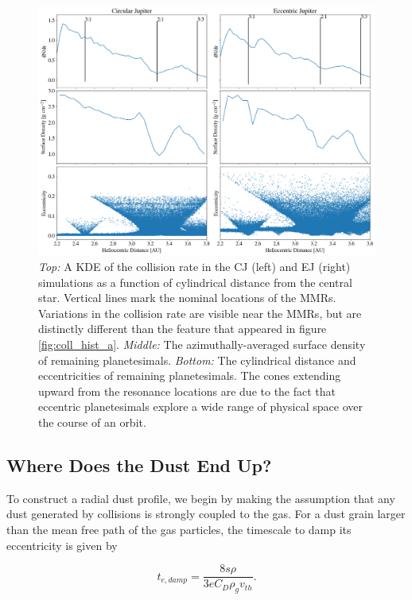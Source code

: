 \documentclass[onecolumn]{aastex63}
\begin{document}
\begin{figure}
    \includegraphics[width=\textwidth]{figures/coll_hist_r.png}
    \caption{\textit{Top:} A KDE of the collision rate in the CJ (left) and EJ (right) simulations as a function of cylindrical distance from the central 
    star. Vertical lines mark the nominal locations of the MMRs. Variations in the collision rate are visible near the MMRs, but are distinctly 
    different than the feature that appeared in figure \ref{fig:coll_hist_a}. \textit{Middle:} The azimuthally-averaged surface density of remaining 
    planetesimals. \textit{Bottom:} The cylindrical distance and eccentricities of remaining planetesimals. The cones extending upward from the 
    resonance locations are due to the fact that eccentric planetesimals explore a wide range of physical space over the course of an orbit.\label{fig:coll_hist_r}}
\end{figure}

\subsection{Where Does the Dust End Up?}

To construct a radial dust profile, we begin by making the assumption that any dust generated by collisions is strongly coupled to the 
gas. For a dust grain larger than the mean free path of the gas particles, the timescale to damp its eccentricity is given by 
\citep{1976PThPh..56.1756A}

\begin{equation}\label{eq:t_edamp}
    t_{e, damp} = \frac{8 s \rho}{3 e C_{D} \rho_{g} v_{th}}.
\end{equation}
\end{document}

